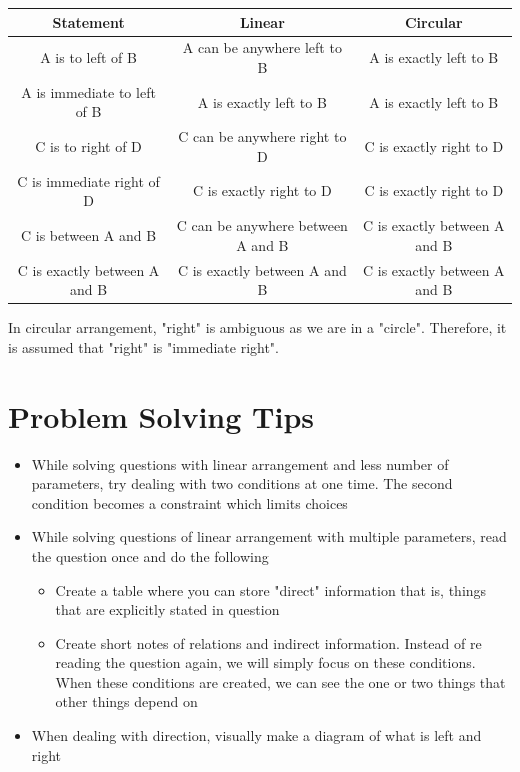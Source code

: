 \begin{table}[h!]
    \centering
    \begin{tabular}{|| c | c | c ||}
        \hline
        Statement & Linear & Circular \\
        \hline
        A is to left of B & A can be anywhere left to B & A is exactly left to B \\
        \hline
        A is immediate to left of B & A is exactly left to B & A is exactly left to B \\
        \hline
        C is to right of D & C can be anywhere right to D & C is exactly right to D \\
        \hline
        C is immediate right of D & C is exactly right to D & C is exactly right to D \\
        \hline 
        C is between A and B & C can be anywhere between A and B & C is exactly between A and B \\
        \hline 
        C is exactly between A and B & C is exactly between A and B & C is exactly between A and B \\
        \hline 
    \end{tabular}
\end{table}

In circular arrangement, "right" is ambiguous as we are in a "circle". Therefore, it is assumed that "right" is "immediate right". 

\section{Problem Solving Tips}
\begin{itemize}
    \item While solving questions with linear arrangement and less number of parameters, try dealing with two conditions at one time. The second condition becomes a constraint which limits choices
    \item While solving questions of linear arrangement with multiple parameters, read the question once and do the following
    \begin{itemize}
        \item Create a table where you can store "direct" information that is, things that are explicitly stated in question 
        \item Create short notes of relations and indirect information. Instead of re reading the question again, we will simply focus on these conditions. When these conditions are created, we can see the one or two things that other things depend on
    \end{itemize} 
    \item When dealing with direction, visually make a diagram of what is left and right
\end{itemize}

